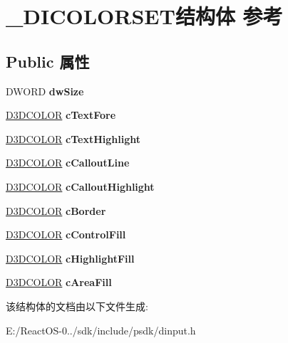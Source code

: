 \hypertarget{struct___d_i_c_o_l_o_r_s_e_t}{}\section{\+\_\+\+D\+I\+C\+O\+L\+O\+R\+S\+E\+T结构体 参考}
\label{struct___d_i_c_o_l_o_r_s_e_t}
\subsection*{Public 属性}
\begin{DoxyCompactItemize}
\item 
\mbox{\label{struct___d_i_c_o_l_o_r_s_e_t_a0c65095ebfc4c3dfe28fbbc75a334746}} 
D\+W\+O\+RD {\bfseries dw\+Size}
\item 
\mbox{\label{struct___d_i_c_o_l_o_r_s_e_t_a45b2b16eae6c72c231449b641e501573}} 
\hyperlink{struct_d3_d_c_o_l_o_r}{D3\+D\+C\+O\+L\+OR} {\bfseries c\+Text\+Fore}
\item 
\mbox{\label{struct___d_i_c_o_l_o_r_s_e_t_af028b783928c3f8e77484c71ee497679}} 
\hyperlink{struct_d3_d_c_o_l_o_r}{D3\+D\+C\+O\+L\+OR} {\bfseries c\+Text\+Highlight}
\item 
\mbox{\label{struct___d_i_c_o_l_o_r_s_e_t_ab2d63d7735d09f095d7c8885839b1795}} 
\hyperlink{struct_d3_d_c_o_l_o_r}{D3\+D\+C\+O\+L\+OR} {\bfseries c\+Callout\+Line}
\item 
\mbox{\label{struct___d_i_c_o_l_o_r_s_e_t_a7bdbde250594a90cf01383d5c44baf2b}} 
\hyperlink{struct_d3_d_c_o_l_o_r}{D3\+D\+C\+O\+L\+OR} {\bfseries c\+Callout\+Highlight}
\item 
\mbox{\label{struct___d_i_c_o_l_o_r_s_e_t_a7d4442c8926e9296f82890141358fab0}} 
\hyperlink{struct_d3_d_c_o_l_o_r}{D3\+D\+C\+O\+L\+OR} {\bfseries c\+Border}
\item 
\mbox{\label{struct___d_i_c_o_l_o_r_s_e_t_ad15cd591b6bfd7c58a576ac12a7d3c6a}} 
\hyperlink{struct_d3_d_c_o_l_o_r}{D3\+D\+C\+O\+L\+OR} {\bfseries c\+Control\+Fill}
\item 
\mbox{\label{struct___d_i_c_o_l_o_r_s_e_t_a96b6b33787aea8245f0e31bccf06578e}} 
\hyperlink{struct_d3_d_c_o_l_o_r}{D3\+D\+C\+O\+L\+OR} {\bfseries c\+Highlight\+Fill}
\item 
\mbox{\label{struct___d_i_c_o_l_o_r_s_e_t_a7e32f1f66d973e9f44f415266c2ebfd7}} 
\hyperlink{struct_d3_d_c_o_l_o_r}{D3\+D\+C\+O\+L\+OR} {\bfseries c\+Area\+Fill}
\end{DoxyCompactItemize}


该结构体的文档由以下文件生成\+:\begin{DoxyCompactItemize}
\item 
E\+:/\+React\+O\+S-\/0../sdk/include/psdk/dinput.\+h\end{DoxyCompactItemize}
